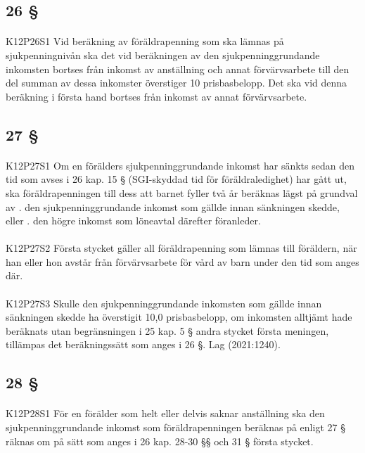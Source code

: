 \documentclass[a4paper,notitlepage,openany,10pt]{book}
\begin{document}
\subsection*{26 §}
\paragraph*{}
{\tiny K12P26S1}
Vid beräkning av föräldrapenning som ska lämnas på sjukpenningnivån ska det vid beräkningen av den sjukpenninggrundande inkomsten bortses från inkomst av anställning och annat förvärvsarbete till den del summan av dessa inkomster överstiger 10 prisbasbelopp. Det ska vid denna beräkning i första hand bortses från inkomst av annat förvärvsarbete.
\subsection*{27 §}
\paragraph*{}
{\tiny K12P27S1}
Om en förälders sjukpenninggrundande inkomst har sänkts sedan den tid som avses i 26 kap. 15 § (SGI-skyddad tid för föräldraledighet) har gått ut, ska föräldrapenningen till dess att barnet fyller två år beräknas lägst på grundval av
. den sjukpenninggrundande inkomst som gällde innan sänkningen skedde, eller
. den högre inkomst som löneavtal därefter föranleder.
\paragraph*{}
{\tiny K12P27S2}
Första stycket gäller all föräldrapenning som lämnas till föräldern, när han eller hon avstår från förvärvsarbete för vård av barn under den tid som anges där.
\paragraph*{}
{\tiny K12P27S3}
Skulle den sjukpenninggrundande inkomsten som gällde innan sänkningen skedde ha överstigit 10,0 prisbasbelopp, om inkomsten alltjämt hade beräknats utan begränsningen i 25 kap. 5 § andra stycket första meningen, tillämpas det beräkningssätt som anges i 26 §.
Lag (2021:1240).
\subsection*{28 §}
\paragraph*{}
{\tiny K12P28S1}
För en förälder som helt eller delvis saknar anställning ska den sjukpenninggrundande inkomst som föräldrapenningen beräknas på enligt 27 § räknas om på sätt som anges i 26 kap. 28-30 §§ och 31 § första stycket.
\end{document}
